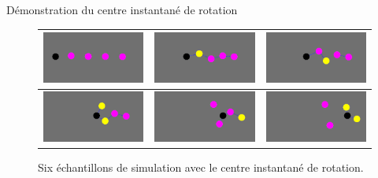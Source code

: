 \documentclass{beamer}
\begin{document}
\begin{frame}{Démonstration du centre instantané de rotation}
  \begin{figure}
    \begin{center}
    \begin{tabular}{|M|M|M|}
      \hline
      \includegraphics[width=3.5cm]{Images/cir_1.png} &
      \includegraphics[width=3.5cm]{Images/cir_2.png} &
      \includegraphics[width=3.5cm]{Images/cir_3.png} \\
      \hline
      \includegraphics[width=3.5cm]{Images/cir_4.png} &
      \includegraphics[width=3.5cm]{Images/cir_5.png} &
      \includegraphics[width=3.5cm]{Images/cir_6.png} \\
      \hline
    \end{tabular}
    \end{center}
    \caption{Six échantillons de simulation avec le centre instantané de rotation.}
  \end{figure}
\end{frame}
\end{document}
